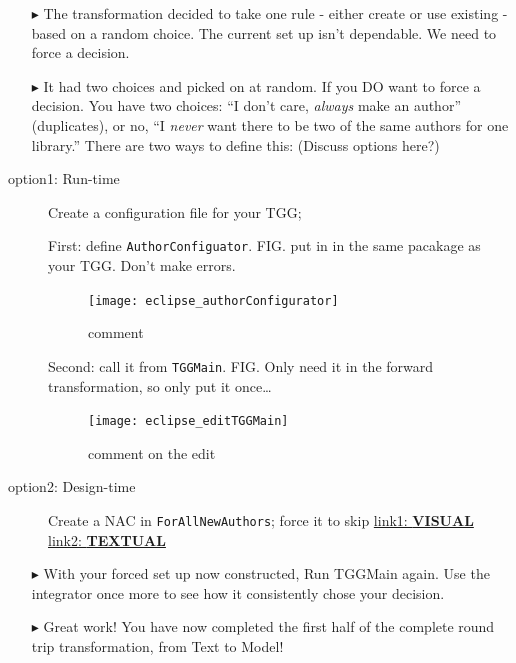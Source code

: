 \begin{itemize}
\item[$\blacktriangleright$] The transformation decided to take one rule - either create or use existing - based on a random choice. The current set up isn't
dependable. We need to force a decision.

\item[$\blacktriangleright$] It had two choices and picked on at random. If you DO want to force a decision. You have two choices: ``I
don't care, \emph{always} make an author'' (duplicates), or no, ``I \emph{never} want there to be two of the same authors for one library.'' There are two ways
to define this: (Discuss options here?)

\end{itemize}

\begin{description}

\item[option1: Run-time] Create a configuration file for your TGG;

First: define \texttt{AuthorConfiguator}. FIG. put in in the same pacakage as your TGG. Don't make errors.

\begin{figure}[htbp]
\begin{center}
  \texttt{[image: eclipse\_authorConfigurator]}
  \caption{comment}
  \label{eclipse:authorConfig}
\end{center}
\end{figure}

Second: call it from \texttt{TGGMain}. FIG. Only need it in the forward transformation, so only put it once\ldots

\begin{figure}[htbp]
\begin{center}
  \texttt{[image: eclipse\_editTGGMain]}
  \caption{comment on the edit}
  \label{eclipse:editTGGMain}
\end{center}
\end{figure}

\newpage

\item[option2: Design-time] Create a NAC in \texttt{ForAllNewAuthors}; force it to skip
\hyperlink{NAC vis}{link1: {\bf VISUAL}}
\hyperlink{NAC tex}{link2: {\bf TEXTUAL}}





\end{description}

\newpage
\begin{itemize}

\item[$\blacktriangleright$] With your forced set up now constructed, Run TGGMain again. Use the integrator once more to see how it consistently chose your
decision.

\item[$\blacktriangleright$] Great work! You have now completed the first half of the complete round trip transformation, from Text to Model!

\end{itemize}
